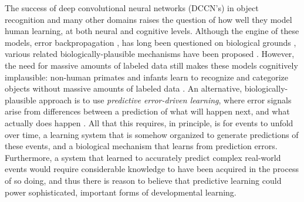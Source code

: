 \documentclass[12pt,twoside]{article}
\newif\myifpdf
\begin{document}
The success of deep convolutional neural networks (DCCN's) \cite{KrizhevskySutskeverHinton12,LeCunBengioHinton15,Schmidhuber15a} in object recognition and many other domains raises the question of how well they model human learning, at both neural and cognitive levels.  Although the engine of these models, error backpropagation \cite{RumelhartHintonWilliams86}, has long been questioned on biological grounds \cite{Crick89}, various related biologically-plausible mechanisms have been proposed \cite{OReilly96,XieSeung03,BengioMesnardFischerEtAl17}.  However, the need for massive amounts of labeled data still makes these models cognitively implausible: non-human primates and infants learn to recognize and categorize objects without 
massive amounts of labeled data \cite{LakeUllmanTenenbaumEtAl17}.  An alternative, biologically-plausible approach is to use {\em predictive error-driven learning}, where error signals arise from differences between a prediction of what will happen next, and what actually does happen \cite{Elman90,ElmanBatesKarmiloff-SmithEtAl96}.  All that this requires, in principle, is for events to unfold over time, a learning system that is somehow organized to generate predictions of these events, and a biological mechanism that learns from prediction errors. Furthermore, a system that learned to accurately predict complex real-world events would require considerable knowledge to have been acquired in the process of so doing, and thus there is reason to believe that predictive learning could power sophisticated, important forms of developmental learning.

\end{document}
